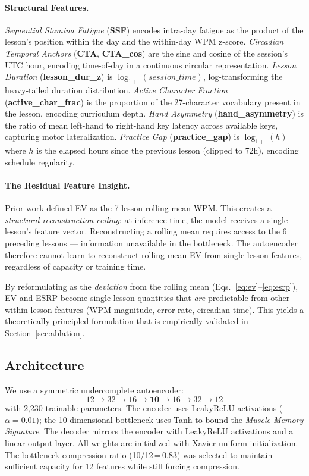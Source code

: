 \paragraph{Structural Features.}
\emph{Sequential Stamina Fatigue} (\textbf{SSF}) encodes intra-day fatigue as
the product of the lesson's position within the day and the within-day
WPM z-score.
\emph{Circadian Temporal Anchors} (\textbf{CTA}, \textbf{CTA\_cos}) are the
sine and cosine of the session's UTC hour, encoding time-of-day in a
continuous circular representation.
\emph{Lesson Duration} (\textbf{lesson\_dur\_z}) is \(\log_{1\!+}(session\_time)\),
log-transforming the heavy-tailed duration distribution.
\emph{Active Character Fraction} (\textbf{active\_char\_frac}) is the
proportion of the 27-character vocabulary present in the lesson, encoding
curriculum depth.
\emph{Hand Asymmetry} (\textbf{hand\_asymmetry}) is the ratio of mean
left-hand to right-hand key latency across available keys, capturing
motor lateralization.
\emph{Practice Gap} (\textbf{practice\_gap}) is \(\log_{1\!+}(h)\) where
\(h\) is the elapsed hours since the previous lesson (clipped to 72h),
encoding schedule regularity.

\paragraph{The Residual Feature Insight.}
\label{sec:residual}
Prior work defined EV as the 7-lesson rolling mean WPM.
This creates a \emph{structural reconstruction ceiling}: at inference time,
the model receives a single lesson's feature vector.
Reconstructing a rolling mean requires access to the 6 preceding lessons ---
information unavailable in the bottleneck.
The autoencoder therefore cannot learn to reconstruct rolling-mean EV from
single-lesson features, regardless of capacity or training time.

By reformulating as the \emph{deviation} from the rolling mean
(Eqs.~\ref{eq:ev}--\ref{eq:esrp}), EV and ESRP become single-lesson
quantities that \emph{are} predictable from other within-lesson features
(WPM magnitude, error rate, circadian time).
This yields a theoretically principled formulation that is empirically
validated in Section~\ref{sec:ablation}.

\subsection{Architecture}
\label{sec:arch}

We use a symmetric undercomplete autoencoder:
\[
12 \xrightarrow{} 32 \xrightarrow{} 16 \xrightarrow{} \mathbf{10}
  \xrightarrow{} 16 \xrightarrow{} 32 \xrightarrow{} 12
\]
with 2,230 trainable parameters.
The encoder uses LeakyReLU activations (\(\alpha{=}0.01\)); the 10-dimensional
bottleneck uses Tanh to bound the \emph{Muscle Memory Signature}.
The decoder mirrors the encoder with LeakyReLU activations and a linear
output layer.
All weights are initialized with Xavier uniform initialization.
The bottleneck compression ratio (10/12\,=\,0.83) was selected to maintain
sufficient capacity for 12 features while still forcing compression.

